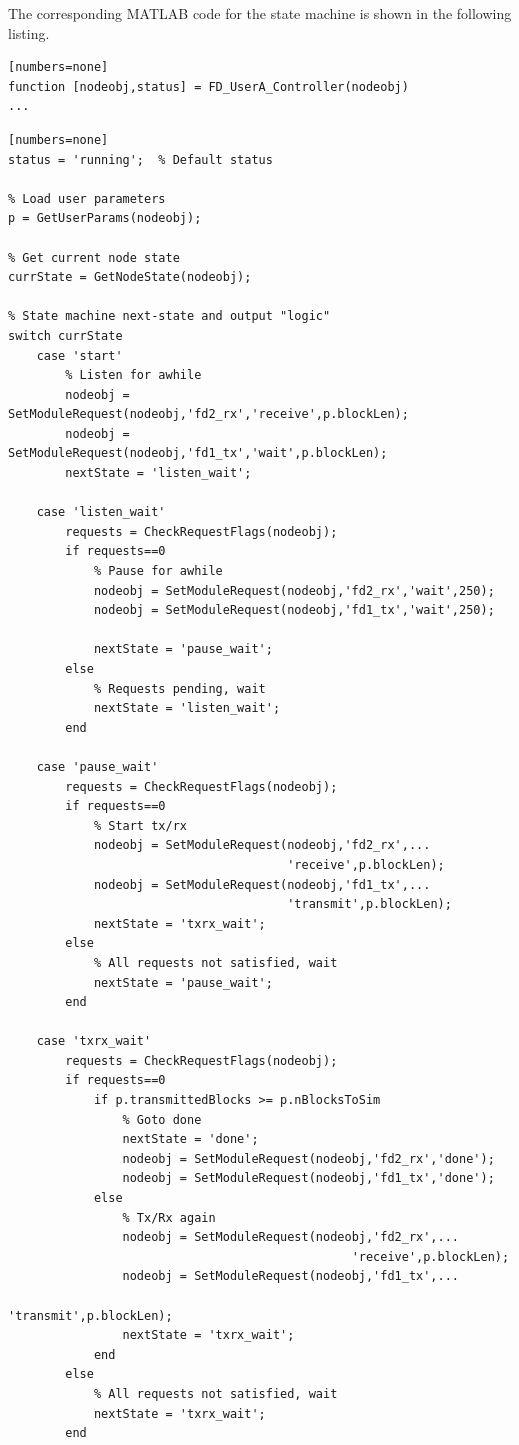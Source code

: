 The corresponding MATLAB code for the state machine is shown in the
following listing.

\begin{lstlisting}[name=fdController][numbers=none]
function [nodeobj,status] = FD_UserA_Controller(nodeobj)
...
\end{lstlisting}
\begin{lstlisting}[name=fdController, firstnumber=24][numbers=none]
status = 'running';  % Default status

% Load user parameters
p = GetUserParams(nodeobj);

% Get current node state
currState = GetNodeState(nodeobj);

% State machine next-state and output "logic"
switch currState
    case 'start'
        % Listen for awhile
        nodeobj = SetModuleRequest(nodeobj,'fd2_rx','receive',p.blockLen);
        nodeobj = SetModuleRequest(nodeobj,'fd1_tx','wait',p.blockLen);
        nextState = 'listen_wait';
        
    case 'listen_wait'
        requests = CheckRequestFlags(nodeobj);
        if requests==0 
            % Pause for awhile
            nodeobj = SetModuleRequest(nodeobj,'fd2_rx','wait',250);
            nodeobj = SetModuleRequest(nodeobj,'fd1_tx','wait',250);
            
            nextState = 'pause_wait';
        else
            % Requests pending, wait
            nextState = 'listen_wait';
        end

    case 'pause_wait'
        requests = CheckRequestFlags(nodeobj);
        if requests==0
            % Start tx/rx
            nodeobj = SetModuleRequest(nodeobj,'fd2_rx',...
                                       'receive',p.blockLen);
            nodeobj = SetModuleRequest(nodeobj,'fd1_tx',...
                                       'transmit',p.blockLen);
            nextState = 'txrx_wait';
        else
            % All requests not satisfied, wait
            nextState = 'pause_wait';
        end
        
    case 'txrx_wait'
        requests = CheckRequestFlags(nodeobj);
        if requests==0
            if p.transmittedBlocks >= p.nBlocksToSim
                % Goto done
                nextState = 'done';
                nodeobj = SetModuleRequest(nodeobj,'fd2_rx','done');
                nodeobj = SetModuleRequest(nodeobj,'fd1_tx','done');
            else
                % Tx/Rx again
                nodeobj = SetModuleRequest(nodeobj,'fd2_rx',...
                                                'receive',p.blockLen);
                nodeobj = SetModuleRequest(nodeobj,'fd1_tx',...
                                                'transmit',p.blockLen);
                nextState = 'txrx_wait';
            end
        else
            % All requests not satisfied, wait
            nextState = 'txrx_wait';
        end
        

\end{lstlisting}
